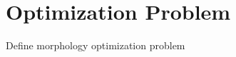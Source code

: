 \chapter{Optimization Problem}
\label{sec:optimization_problem}

Define morphology optimization problem
